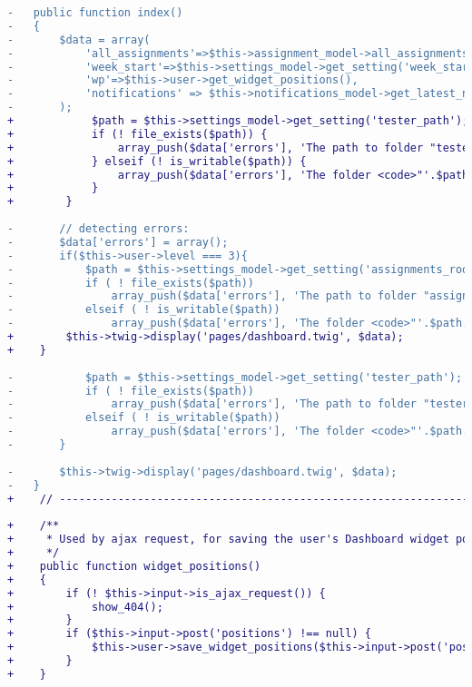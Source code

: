 \begin{lstlisting}[language=diff, basicstyle=\ttfamily, frame=single,
	columns=fullflexible, keepspaces=true, breaklines=true, label=ck:31, caption=Contoh penggunaan PHP CS Fixer pada \textit{Dashboard.php}]
-	public function index()
-	{
-		$data = array(
-			'all_assignments'=>$this->assignment_model->all_assignments(),
-			'week_start'=>$this->settings_model->get_setting('week_start'),
-			'wp'=>$this->user->get_widget_positions(),
-			'notifications' => $this->notifications_model->get_latest_notifications()
-		);
+            $path = $this->settings_model->get_setting('tester_path');
+            if (! file_exists($path)) {
+                array_push($data['errors'], 'The path to folder "tester" is not set correctly. Move this folder somewhere not publicly accessible, and set its full path in Settings.');
+            } elseif (! is_writable($path)) {
+                array_push($data['errors'], 'The folder <code>"'.$path.'"</code> is not writable by PHP. Make it writable. But make sure that this folder is only accessible by you.');
+            }
+        }
			
-		// detecting errors:
-		$data['errors'] = array();
-		if($this->user->level === 3){
-			$path = $this->settings_model->get_setting('assignments_root');
-			if ( ! file_exists($path))
-				array_push($data['errors'], 'The path to folder "assignments" is not set correctly. Move this folder somewhere not publicly accessible, and set its full path in Settings.');
-			elseif ( ! is_writable($path))
-				array_push($data['errors'], 'The folder <code>"'.$path.'"</code> is not writable by PHP. Make it writable. But make sure that this folder is only accessible by you. Codes will be saved in this folder!');
+        $this->twig->display('pages/dashboard.twig', $data);
+    }
			
-			$path = $this->settings_model->get_setting('tester_path');
-			if ( ! file_exists($path))
-				array_push($data['errors'], 'The path to folder "tester" is not set correctly. Move this folder somewhere not publicly accessible, and set its full path in Settings.');
-			elseif ( ! is_writable($path))
-				array_push($data['errors'], 'The folder <code>"'.$path.'"</code> is not writable by PHP. Make it writable. But make sure that this folder is only accessible by you.');
-		}
		
-		$this->twig->display('pages/dashboard.twig', $data);
-	}
+    // ------------------------------------------------------------------------
	
+    /**
+     * Used by ajax request, for saving the user's Dashboard widget positions
+     */
+    public function widget_positions()
+    {
+        if (! $this->input->is_ajax_request()) {
+            show_404();
+        }
+        if ($this->input->post('positions') !== null) {
+            $this->user->save_widget_positions($this->input->post('positions'));
+        }
+    }
	

\end{lstlisting}
